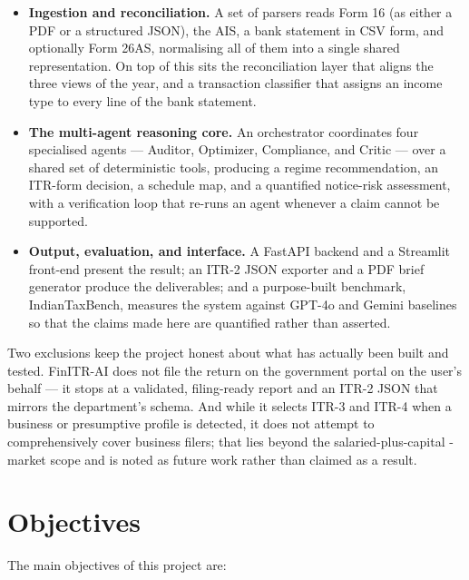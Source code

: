 \documentclass[12pt, a4paper, oneside]{report}
\begin{document}
\begin{itemize}
    \item \textbf{Ingestion and reconciliation.} A set of parsers reads Form 16
          (as either a PDF or a structured JSON), the AIS, a bank statement in
          CSV form, and optionally Form 26AS, normalising all of them into a
          single shared representation. On top of this sits the reconciliation
          layer that aligns the three views of the year, and a transaction
          classifier that assigns an income type to every line of the bank
          statement.
    \item \textbf{The multi-agent reasoning core.} An orchestrator coordinates
          four specialised agents --- Auditor, Optimizer, Compliance, and Critic
          --- over a shared set of deterministic tools, producing a regime
          recommendation, an ITR-form decision, a schedule map, and a quantified
          notice-risk assessment, with a verification loop that re-runs an agent
          whenever a claim cannot be supported.
    \item \textbf{Output, evaluation, and interface.} A FastAPI backend and a
          Streamlit front-end present the result; an ITR-2 JSON exporter and a
          PDF brief generator produce the deliverables; and a purpose-built
          benchmark, IndianTaxBench, measures the system against GPT-4o and
          Gemini baselines so that the claims made here are quantified rather
          than asserted.
\end{itemize}

Two exclusions keep the project honest about what has actually been built and
tested. FinITR-AI does not file the return on the government portal on the
user's behalf --- it stops at a validated, filing-ready report and an ITR-2 JSON
that mirrors the department's schema. And while it selects ITR-3 and ITR-4 when
a business or presumptive profile is detected, it does not attempt to
comprehensively cover business filers; that lies beyond the salaried-plus-capital
-market scope and is noted as future work rather than claimed as a result.

\section{Objectives}
\label{sec:objectives}

The main objectives of this project are:
\end{document}
